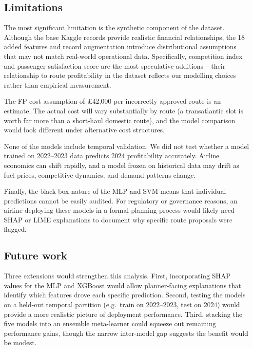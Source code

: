 \documentclass[12pt,a4paper]{article}
\begin{document}
\subsection{Limitations}
\label{subsec:limitations}

The most significant limitation is the synthetic component of the dataset. Although the base Kaggle records provide realistic financial relationships, the 18 added features and record augmentation introduce distributional assumptions that may not match real-world operational data. Specifically, competition index and passenger satisfaction score are the most speculative additions -- their relationship to route profitability in the dataset reflects our modelling choices rather than empirical measurement.

The FP cost assumption of £42,000 per incorrectly approved route is an estimate. The actual cost will vary substantially by route (a transatlantic slot is worth far more than a short-haul domestic route), and the model comparison would look different under alternative cost structures.

None of the models include temporal validation. We did not test whether a model trained on 2022--2023 data predicts 2024 profitability accurately. Airline economics can shift rapidly, and a model frozen on historical data may drift as fuel prices, competitive dynamics, and demand patterns change.

Finally, the black-box nature of the MLP and SVM means that individual predictions cannot be easily audited. For regulatory or governance reasons, an airline deploying these models in a formal planning process would likely need SHAP or LIME explanations to document why specific route proposals were flagged.

\subsection{Future work}
\label{subsec:future}

Three extensions would strengthen this analysis. First, incorporating SHAP values for the MLP and XGBoost would allow planner-facing explanations that identify which features drove each specific prediction. Second, testing the models on a held-out temporal partition (e.g.\ train on 2022--2023, test on 2024) would provide a more realistic picture of deployment performance. Third, stacking the five models into an ensemble meta-learner could squeeze out remaining performance gains, though the narrow inter-model gap suggests the benefit would be modest.
\end{document}
